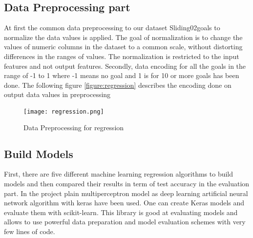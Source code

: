 \subsection{Data Preprocessing part}
At first the common data preprocessing to our dataset Sliding02goals to normalize the data values is applied.\newline
The goal of normalization is to change the values of numeric columns in the dataset to a common scale, without distorting differences in the ranges of values. The normalization is restricted to the input features and not output features.\newline
Secondly, data encoding for all the goals in the range of -1 to 1 where -1 means no goal and 1 is for 10 or more goals has been done. 
The following figure \autoref{figure:regression} describes the encoding done on output data values in preprocessing
\begin{figure}[H]
\begin{center}
\texttt{[image: regression.png]}
\end{center}
\caption{Data Preprocessing for regression }
\label{figure:regression}
\end{figure}
\subsection{Build Models }
First, there are five different machine learning regression algorithms to build models and then compared their results in term of test accuracy in the evaluation part.\newline \newline
In the project plain multiperceptron model as deep learning artificial neural network algorithm with keras have been used. One can create Keras models and evaluate them with scikit-learn. This library is good at evaluating models and allows to use powerful data preparation and model evaluation schemes with very few lines of code.

